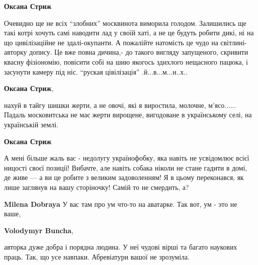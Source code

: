 \begin{itemize}
\begin{itemize}
 
\textbf{Оксана Стриж} 

Очевидно ще не всіх \enquote{злобних} москвинота виморила голодом. Залишились ще такі
котрі хочуть самі наводити лад у своїй хаті, а не це будуть робити дикі, ні на
що цивілізаційне не здалі-окупанти. А пожалійте натомість це чудо на
світлині-авторку допису. Це вже повна дичина,- до такого вигляду запущеного,
скривити квасну фізіономію, повісити собі на шию якогось здихлого нещасного
пацюка, і засунути камеру під ніс. \enquote{руская цівілізація} .й...в...м...н..х..

 
\textbf{Оксана Стриж}, 

нахуй в тайгу шишки жерти, а не овочі, які я виростила, молочне, м'ясо......
Падаль московитська не має жерти вирощене, вигодоване в українському селі, на
українській землі.


 
\textbf{Оксана Стриж} 

А мені більше жаль вас - недолугу українофобку, яка навіть не усвідомлює всієї
ницості своєї позиції! Вибачте, але навіть собака ніколи не стане гадити в
домі, де живе — а ви це робите з великим задоволенням! Я в цьому переконався,
як лише заглянув на вашу сторіночку! Самій то не смердить, а?


 
\textbf{Milena Dobraya} У вас там про ум что-то на аватарке. Так вот, ум - это не ваше,

 
\textbf{Volodymyr Buncha}, 

авторка дуже добра і порядна людина. У неї чудові вірші та багато наукових
праць. Так, що усе навпаки. Абревіатури вашої не зрозуміла. \Smiley[1.0][yellow]


\end{itemize}
\end{itemize}
